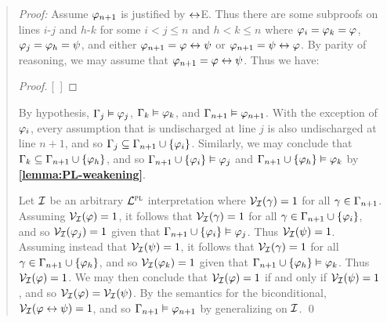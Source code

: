 \begin{quote} 
  \textit{Proof:}
  Assume $\varphi_{n+1}$ is justified by $\leftrightarrow$E.
  Thus there are some subproofs on lines $i$-$j$ and $h$-$k$ for some $i<j\leq n$ and $h<k\leq n$ where $\varphi_i=\varphi_k=\varphi$, $\varphi_j=\varphi_h=\psi$, and either $\varphi_{n+1}=\varphi\leftrightarrow\psi$ or $\varphi_{n+1}=\psi\leftrightarrow\varphi$.
  By parity of reasoning, we may assume that $\varphi_{n+1}=\varphi\leftrightarrow\psi$.
  Thus we have:

  \begin{proof}
    \open
       
    \close
    \open
       
    \close
    [\ ]{\metaA \eiff \metaB} 
  \end{proof}

  By hypothesis, $\Gamma_j\vDash \varphi_j$, $\Gamma_k\vDash \varphi_k$, and $\Gamma_{n+1}\vDash \varphi_{n+1}$.
  With the exception of $\varphi_i$, every assumption that is undischarged at line $j$ is also undischarged at line $n+1$, and so $\Gamma_j\subseteq\Gamma_{n+1}\cup\lbrace\varphi_i\rbrace$.
  Similarly, we may conclude that $\Gamma_k\subseteq\Gamma_{n+1}\cup\lbrace\varphi_h\rbrace$, and so $\Gamma_{n+1}\cup\lbrace\varphi_i\rbrace \vDash \varphi_j$ and $\Gamma_{n+1}\cup\lbrace\varphi_h\rbrace \vDash \varphi_k$ by \textbf{\ref{lemma:PL-weakening}}.

  Let $\mathcal{I}$ be an arbitrary $\mathcal{L}^{\textsc{pl}}$ interpretation where $\mathcal{V}_{\mathcal{I}}(\gamma) = 1$ for all $\gamma \in \Gamma_{n+1}$.
  Assuming $\mathcal{V}_{\mathcal{I}}(\varphi) = 1$, it follows that $\mathcal{V}_{\mathcal{I}}(\gamma) = 1$ for all $\gamma \in \Gamma_{n+1} \cup \lbrace\varphi_i\rbrace$, and so $\mathcal{V}_{\mathcal{I}}(\varphi_j) = 1$ given that $\Gamma_{n+1}\cup\lbrace\varphi_i\rbrace \vDash \varphi_j$.
  Thus $\mathcal{V}_{\mathcal{I}}(\psi) = 1$.
  Assuming instead that $\mathcal{V}_{\mathcal{I}}(\psi) = 1$, it follows that $\mathcal{V}_{\mathcal{I}}(\gamma) = 1$ for all $\gamma \in \Gamma_{n+1} \cup \lbrace\varphi_h\rbrace$, and so $\mathcal{V}_{\mathcal{I}}(\varphi_k) = 1$ given that $\Gamma_{n+1}\cup\lbrace\varphi_h\rbrace \vDash \varphi_k$.
  Thus $\mathcal{V}_{\mathcal{I}}(\varphi) = 1$.
  We may then conclude that $\mathcal{V}_{\mathcal{I}}(\varphi) = 1$ if and only if $\mathcal{V}_{\mathcal{I}}(\psi) = 1$, and so $\mathcal{V}_{\mathcal{I}}(\varphi) = \mathcal{V}_{\mathcal{I}}(\psi)$.
  By the semantics for the biconditional, $\mathcal{V}_{\mathcal{I}}(\varphi \leftrightarrow \psi) = 1$, and so $\Gamma_{n+1}\vDash\varphi_{n+1}$ by generalizing on $\mathcal{I}$.
  \qed
\end{quote}





